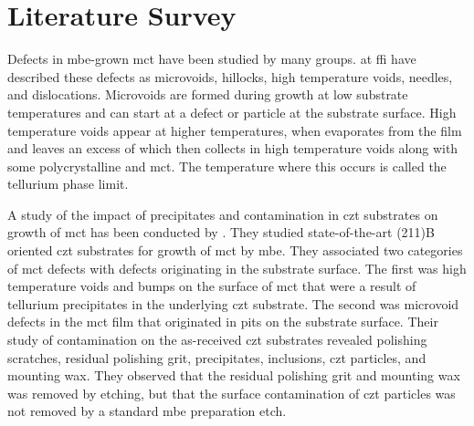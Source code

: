 \section{Literature Survey}%
%
%
%
%
%
Defects in \ac{mbe}-grown \ac{mct} have been studied by many groups. \citet{selvig2007defects, selvig2008defects-a, selvig2008defects-b} at \ac{ffi} have described these defects as microvoids, hillocks, high temperature voids, needles, and dislocations. Microvoids are formed during growth at low substrate temperatures and can start at a defect or particle at the substrate surface. High temperature voids appear at higher temperatures, when  evaporates from the film and leaves an excess of  which then collects in high temperature voids along with some polycrystalline  and \ac{mct}. The temperature where this occurs is called the tellurium phase limit.

A study of the impact of precipitates and contamination in \ac{czt} substrates on growth of \ac{mct} has been conducted by \citet{benson2014impact, benson2015as-received, benson2016analysis}. They studied state-of-the-art (211)B oriented \ac{czt} substrates for growth of \ac{mct} by \ac{mbe}. They associated two categories of \ac{mct} defects with defects originating in the substrate surface. The first was high temperature voids and bumps on the surface of \ac{mct} that were a result of tellurium precipitates in the underlying \ac{czt} substrate. The second was microvoid defects in the \ac{mct} film that originated in pits on the substrate surface. Their study of contamination on the as-received \ac{czt} substrates revealed polishing scratches,  residual polishing grit,  precipitates,  inclusions, \ac{czt} particles, and mounting wax. They observed that the residual polishing grit and mounting wax was removed by etching, but that the surface contamination of \ac{czt} particles was not removed by a standard \ac{mbe} preparation etch. %

